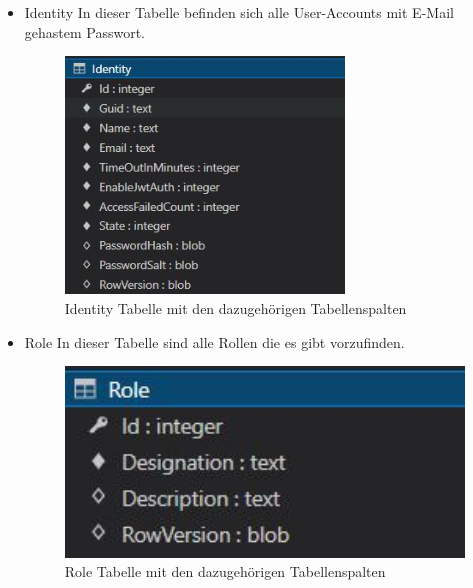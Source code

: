 \begin{itemize}
    \item Identity
    In dieser Tabelle befinden sich alle User-Accounts mit E-Mail gehastem Passwort.

    \begin{figure}[H]
        \centering
        \includegraphics[width=0.7\textwidth]{pics/IdentityTableStructur.JPG}
        \caption{Identity Tabelle mit den dazugehörigen Tabellenspalten}
    \end{figure}

\end{itemize}


\begin{itemize}
    \item Role
    In dieser Tabelle sind alle Rollen die es gibt vorzufinden.

    \begin{figure}[H]
        \centering
        \includegraphics[width=1\textwidth]{pics/RoleTableStructure.JPG}
        \caption{Role Tabelle mit den dazugehörigen Tabellenspalten}
    \end{figure}

\end{itemize}

